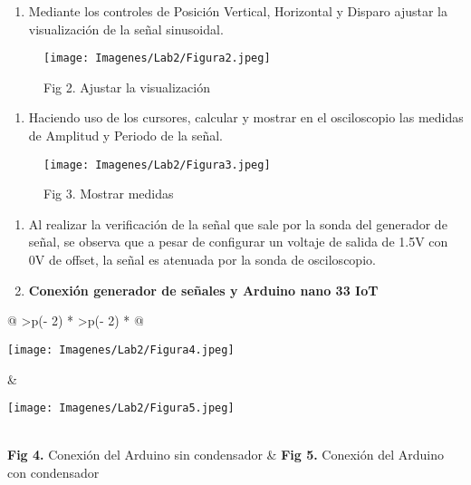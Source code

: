 \documentclass[
  letterpaper,
  DIV=11,
  numbers=noendperiod]{scrartcl}
\providecommand{\tightlist}{%
  \setlength{\itemsep}{0pt}\setlength{\parskip}{0pt}}\usepackage{longtable,booktabs,array}
\begin{document}
\begin{enumerate}
\def\labelenumi{\arabic{enumi}.}
\setcounter{enumi}{3}
\tightlist
\item
  Mediante los controles de Posición Vertical, Horizontal y Disparo
  ajustar la visualización de la señal sinusoidal.
\end{enumerate}

\begin{figure}[H]

{\centering \texttt{[image: Imagenes/Lab2/Figura2.jpeg]}

}

\caption{Fig 2. Ajustar la visualización}

\end{figure}%

\begin{enumerate}
\def\labelenumi{\arabic{enumi}.}
\setcounter{enumi}{4}
\tightlist
\item
  Haciendo uso de los cursores, calcular y mostrar en el osciloscopio
  las medidas de Amplitud y Periodo de la señal.
\end{enumerate}

\begin{figure}[H]

{\centering \texttt{[image: Imagenes/Lab2/Figura3.jpeg]}

}

\caption{Fig 3. Mostrar medidas}

\end{figure}%

\begin{enumerate}
\def\labelenumi{\arabic{enumi}.}
\setcounter{enumi}{5}
\item
  Al realizar la verificación de la señal que sale por la sonda del
  generador de señal, se observa que a pesar de configurar un voltaje de
  salida de 1.5V con 0V de offset, la señal es atenuada por la sonda de
  osciloscopio.
\item
  \textbf{Conexión generador de señales y Arduino nano 33 IoT}
\end{enumerate}

\begin{longtable}[]{@{}
  >{\centering\arraybackslash}p{(\columnwidth - 2\tabcolsep) * }
  >{\centering\arraybackslash}p{(\columnwidth - 2\tabcolsep) * }@{}}
\toprule\noalign{}
\begin{minipage}[b]{\linewidth}\centering
\texttt{[image: Imagenes/Lab2/Figura4.jpeg]}
\end{minipage} & \begin{minipage}[b]{\linewidth}\centering
\texttt{[image: Imagenes/Lab2/Figura5.jpeg]}
\end{minipage} \\
\midrule\noalign{}
\endhead
\bottomrule\noalign{}
\endlastfoot
\textbf{Fig 4.} Conexión del Arduino sin condensador & \textbf{Fig 5.}
Conexión del Arduino con condensador \\
\end{longtable}
\end{document}
